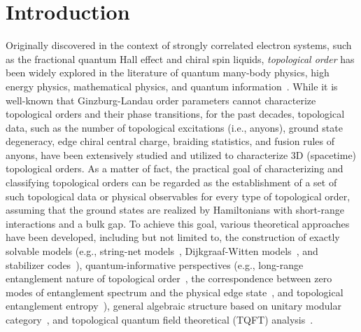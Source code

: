 \documentclass[11pt,nofootinbib,preprint]{revtex4-1}
\begin{document}
\section{Introduction\label{s1}}
Originally discovered in the context of strongly correlated electron systems, such as the fractional quantum Hall effect and chiral spin liquids, \textit{topological order} has been widely explored in the literature of quantum many-body physics, high energy physics, mathematical physics, and quantum information~\cite{wenZootopoRMP}. While it is well-known that Ginzburg-Landau order parameters cannot characterize topological orders and their phase transitions, for the past decades, topological data, such as the number of topological excitations (i.e., anyons), ground state degeneracy, edge chiral central charge, braiding statistics, and fusion rules of anyons, have been extensively studied and utilized to characterize  3D (spacetime) topological orders.  As a matter of fact, the practical goal of characterizing and classifying topological orders can be regarded as the establishment of a set of such topological data or physical observables for every type of topological order, assuming that the ground states are realized by Hamiltonians with short-range interactions and a bulk gap. To achieve this goal, various theoretical approaches have been developed, including but not limited to, the construction of exactly solvable models (e.g., string-net models~\cite{string1}, Dijkgraaf-Witten models~\cite{dwitten}, and stabilizer codes~\cite{Kitaev2003faulttolerant}), quantum-informative perspectives (e.g.,  long-range entanglement nature of topological order~\cite{CGW2010LRE},   the correspondence between zero modes of entanglement spectrum and the physical edge state~\cite{Li_Haldane}, and topological entanglement entropy~\cite{KitaevTopoEE,Levin_Wen_TEE}), general algebraic structure based on unitary modular category~\cite{Kitaev2006,string1,Kong2020}, and topological quantum  field theoretical (TQFT) analysis~\cite{Witten1989,Turaev2016}.  
\end{document}
